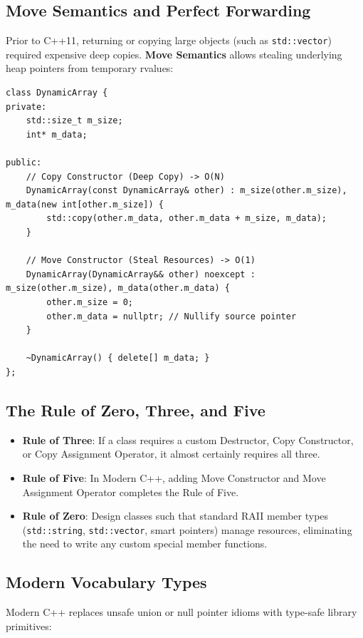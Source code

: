 \documentclass[10pt,journal,compsoc,onecolumn]{IEEEtran}
\begin{document}
\subsection{Move Semantics and Perfect Forwarding}
Prior to C++11, returning or copying large objects (such as \texttt{std::vector}) required expensive deep copies. \textbf{Move Semantics} allows stealing underlying heap pointers from temporary rvalues:

\begin{verbatim}
class DynamicArray {
private:
    std::size_t m_size;
    int* m_data;

public:
    // Copy Constructor (Deep Copy) -> O(N)
    DynamicArray(const DynamicArray& other) : m_size(other.m_size), m_data(new int[other.m_size]) {
        std::copy(other.m_data, other.m_data + m_size, m_data);
    }

    // Move Constructor (Steal Resources) -> O(1)
    DynamicArray(DynamicArray&& other) noexcept : m_size(other.m_size), m_data(other.m_data) {
        other.m_size = 0;
        other.m_data = nullptr; // Nullify source pointer
    }

    ~DynamicArray() { delete[] m_data; }
};
\end{verbatim}

\subsection{The Rule of Zero, Three, and Five}
\begin{itemize}
    \item \textbf{Rule of Three}: If a class requires a custom Destructor, Copy Constructor, or Copy Assignment Operator, it almost certainly requires all three.
    \item \textbf{Rule of Five}: In Modern C++, adding Move Constructor and Move Assignment Operator completes the Rule of Five.
    \item \textbf{Rule of Zero}: Design classes such that standard RAII member types (\texttt{std::string}, \texttt{std::vector}, smart pointers) manage resources, eliminating the need to write any custom special member functions.
\end{itemize}

\subsection{Modern Vocabulary Types}
Modern C++ replaces unsafe union or null pointer idioms with type-safe library primitives:
\end{document}
